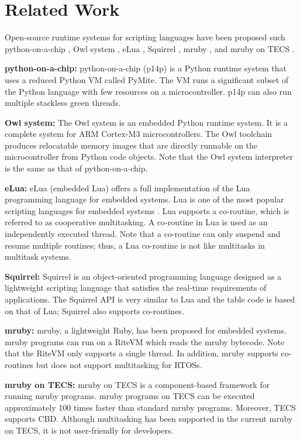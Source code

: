 \documentclass[conference]{IEEEtran/IEEEtran/IEEEtran}
\begin{document}
\section{Related Work}
\label{sec:Related work}
Open-source runtime systems for scripting languages have been proposed such python-on-a-chip \cite{url:python-on-a-chip}, Owl system \cite{par:owl}, eLua \cite{url:eLua}, Squirrel \cite{url:Squirrel}, mruby \cite{par:mruby}, and mruby on TECS \cite{par:mrubyonTECS}.

{\bf python-on-a-chip:} python-on-a-chip (p14p) is a Python runtime system that uses a reduced Python VM called PyMite.
The VM runs a significant subset of the Python language with few resources on a microcontroller.
p14p can also run multiple stackless green threads.

{\bf Owl system:} The Owl system is an embedded Python runtime system.
It is a complete system for ARM Cortex-M3 microcontrollers.
The Owl toolchain produces relocatable memory images that are directly runnable on the microcontroller from Python code objects.
Note that the Owl system interpreter is the same as that of python-on-a-chip.

{\bf eLua:} eLua (embedded Lua) offers a full implementation of the Lua programming language for embedded systems.
Lua is one of the most popular scripting languages for embedded systems \cite{par:Lua}.
Lua supports a co-routine, which is referred to as cooperative multitasking.
A co-routine in Lua is used as an independently executed thread.
Note that a co-routine can only suspend and resume multiple routines; thus, a Lua co-routine is not like multitasks in multitask systems.

{\bf Squirrel:} Squirrel is an object-oriented programming language designed as a lightweight scripting language that satisfies the real-time requirements of applications.
The Squirrel API is very similar to Lua and the table code is based on that of Lua; Squirrel also supports co-routines.

{\bf mruby:} mruby, a lightweight Ruby, has been proposed for embedded systems.
mruby programs can run on a RiteVM which reads the mruby bytecode.
Note that the RiteVM only supports a single thread.
In addition, mruby supports co-routines but does not support multitasking for RTOSs.

{\bf mruby on TECS:} mruby on TECS is a component-based framework for running mruby programs.
mruby programs on TECS can be executed approximately 100 times faster than standard mruby programs.
Moreover, TECS supports CBD.
Although multitasking has been supported in the current mruby on TECS, it is not user-friendly for developers.
\end{document}
